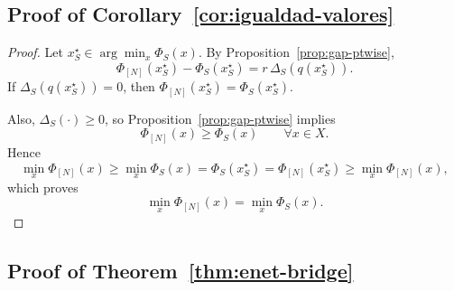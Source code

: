 \documentclass[accepted]{uai2026}
\theoremstyle{plain}
\theoremstyle{definition}
\theoremstyle{remark}
\begin{document}
\subsection{Proof of Corollary~\ref{cor:igualdad-valores}}
\label{app:cor2_4}

\begin{proof}
Let $x_S^\star\in\arg\min_{x}\Phi_S(x)$. By Proposition~\ref{prop:gap-ptwise},
\[
\Phi_{[N]}(x_S^\star)-\Phi_S(x_S^\star)=r\,\Delta_S(q(x_S^\star)).
\]
If $\Delta_S(q(x_S^\star))=0$, then $\Phi_{[N]}(x_S^\star)=\Phi_S(x_S^\star)$.

Also, $\Delta_S(\cdot)\ge 0$, so Proposition~\ref{prop:gap-ptwise} implies
\[
\Phi_{[N]}(x)\ge \Phi_S(x)\qquad\forall x\in X.
\]
Hence
\[
\min_x \Phi_{[N]}(x)\ge \min_x \Phi_S(x)=\Phi_S(x_S^\star)=\Phi_{[N]}(x_S^\star)\ge \min_x \Phi_{[N]}(x),
\]
which proves
\[
\min_x \Phi_{[N]}(x)=\min_x \Phi_S(x).
\]
\end{proof}


\subsection{Proof of Theorem~\ref{thm:enet-bridge}}
\label{app:theom3_1}
\end{document}
